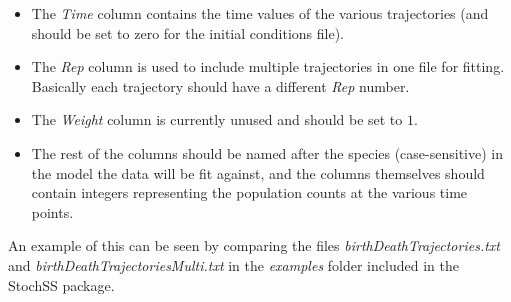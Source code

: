 \begin{itemize}
\item The \textit{Time} column contains the time values of the various trajectories (and should be set to zero for the initial conditions file). 
\item The \textit{Rep} column is used to include multiple trajectories in one file for fitting. Basically each trajectory should have a different \textit{Rep} number.

\item The \textit{Weight} column is currently unused and should be set to $1$.
\item The rest of the columns should be named after the species (case-sensitive) in the model the data will be fit against, and the columns themselves should contain integers representing the population counts at the various time points.
\end{itemize}

An example of this can be seen by comparing the files \textit{birthDeathTrajectories.txt} and \textit{birthDeathTrajectoriesMulti.txt} in the \textit{examples} folder included in the StochSS package.
